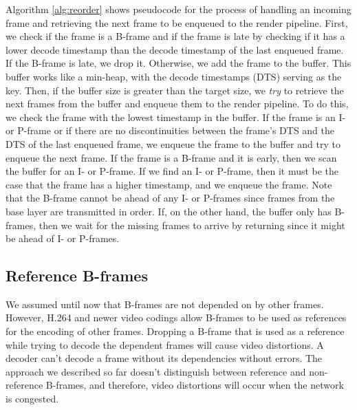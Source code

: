 Algorithm \ref{alg:reorder} shows pseudocode for the process of handling an incoming frame and retrieving the next frame to be enqueued to the render pipeline. First, we check if the frame is a B-frame and if the frame is late by checking if it has a lower decode timestamp than the decode timestamp of the last enqueued frame. If the B-frame is late, we drop it. Otherwise, we add the frame to the buffer. This buffer works like a min-heap, with the decode timestamps (DTS) serving as the key. Then, if the buffer size is greater than the target size, we \textit{try} to retrieve the next frames from the buffer and enqueue them to the render pipeline. To do this, we check the frame with the lowest timestamp in the buffer. If the frame is an I- or P-frame or if there are no discontinuities between the frame's DTS and the DTS of the last enqueued frame, we enqueue the frame to the buffer and try to enqueue the next frame. If the frame is a B-frame and it is early, then we scan the buffer for an I- or P-frame. If we find an I- or P-frame, then it must be the case that the frame has a higher timestamp, and we enqueue the frame. Note that the B-frame cannot be ahead of any I- or P-frames since frames from the base layer are transmitted in order. If, on the other hand, the buffer only has B-frames, then we wait for the missing frames to arrive by returning since it might be ahead of I- or P-frames.

\subsection{Reference B-frames}\label{section:reference_b_frames}
We assumed until now that B-frames are not depended on by other frames. However, H.264 and newer video codings allow B-frames to be used as references for the encoding of other frames. Dropping a B-frame that is used as a reference while trying to decode the dependent frames will cause video distortions. A decoder can't decode a frame without its dependencies without errors. The approach we described so far doesn't distinguish between reference and non-reference B-frames, and therefore, video distortions will occur when the network is congested.

